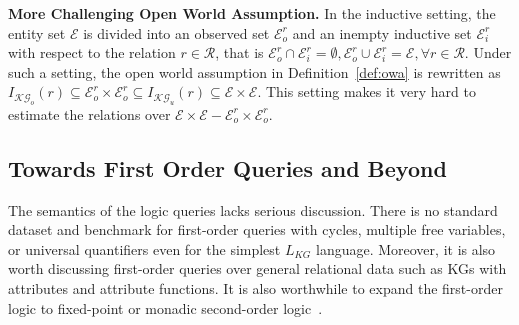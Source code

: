 \documentclass[11pt]{article}
\newcommand{\entity}{\mathcal{E}}
\newcommand{\relation}{\mathcal{R}}
\newcommand{\lang}{\mathcal{L}}
\newcommand{\kg}{\mathcal{KG}}
\begin{document}
\noindent\textbf{More Challenging Open World Assumption.}  In the inductive setting, the entity set $\entity$ is divided into an observed set $\entity_o^r$ and an inempty inductive set $\entity_i^r$ with respect to the relation $r\in \relation$, that is $\entity_o^r\cap\entity_i^r = \emptyset, \entity_o^r\cup\entity_i^r = \entity, \forall r\in\relation$. Under such a setting, the open world assumption in Definition~\ref{def:owa} is rewritten as $I_{\kg_o}(r) \subseteq \entity_o^r\times \entity_o^r \subseteq I_{\kg_u}(r) \subseteq \entity\times \entity$. This setting makes it very hard to estimate the relations over $\entity\times \entity - \entity_o^r\times \entity_o^r $.

\subsection{Towards First Order Queries and Beyond}
The semantics of the logic queries lacks serious discussion. There is no standard dataset and benchmark for first-order queries with cycles, multiple free variables, or universal quantifiers even for the simplest $L_{KG}$ language. Moreover, it is also worth discussing first-order queries over general relational data such as KGs with attributes and attribute functions. It is also worthwhile to expand the first-order logic to fixed-point or monadic second-order logic~\cite{Libkin2004ElementsFinite}.
\end{document}
